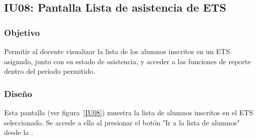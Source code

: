 \subsection{IU08: Pantalla Lista de asistencia de ETS}

\newpage

\subsubsection{Objetivo}
Permitir al docente visualizar la lista de los alumnos inscritos en un ETS asignado, junto con su estado de asistencia, y acceder a las funciones de reporte dentro del periodo permitido.

\subsubsection{Diseño}
Esta pantalla  (ver figura~\ref{IU08}) muestra la lista de alumnos inscritos en el ETS seleccionado. Se accede a ella al presionar el botón "Ir a la lista de alumnos" desde la .



